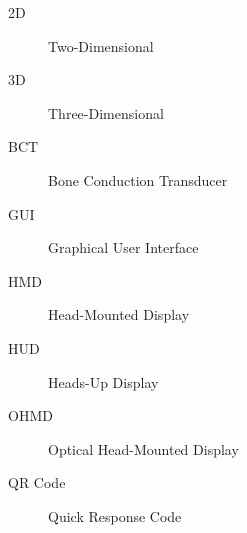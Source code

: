 \begin{description}
	\item [2D] Two-Dimensional
	\item [3D] Three-Dimensional
	\item [BCT] Bone Conduction Transducer
	\item [GUI] Graphical User Interface
	\item [HMD] Head-Mounted Display
	\item [HUD] Heads-Up Display
	\item [OHMD] Optical Head-Mounted Display
	\item [QR Code] Quick Response Code
\end{description}